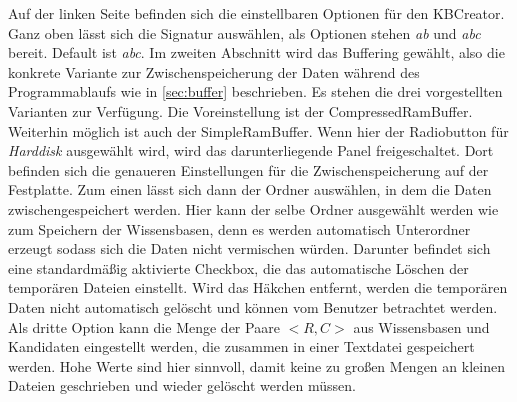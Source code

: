 \documentclass[12pt,a4paper]{article}
\begin{document}
Auf der linken Seite befinden sich die einstellbaren Optionen für den KBCreator. Ganz oben lässt sich die Signatur auswählen, als Optionen stehen \textit{ab} und \textit{abc} bereit. Default ist \textit{abc}. Im zweiten Abschnitt wird das Buffering gewählt, also die konkrete Variante zur Zwischenspeicherung der Daten während des Programmablaufs wie in \autoref{sec:buffer} beschrieben. Es stehen die drei vorgestellten Varianten zur Verfügung. Die Voreinstellung ist der CompressedRamBuffer. Weiterhin möglich ist auch der SimpleRamBuffer. Wenn hier der Radiobutton für \textit{Harddisk} ausgewählt wird, wird das darunterliegende Panel freigeschaltet. Dort befinden sich die genaueren Einstellungen für die Zwischenspeicherung auf der Festplatte. Zum einen lässt sich dann der Ordner auswählen, in dem die Daten zwischengespeichert werden. Hier kann der selbe Ordner ausgewählt werden wie zum Speichern der Wissensbasen, denn es werden automatisch Unterordner erzeugt sodass sich die Daten nicht vermischen würden. Darunter befindet sich eine standardmäßig aktivierte Checkbox, die das automatische Löschen der temporären Dateien einstellt. Wird das Häkchen entfernt, werden die temporären Daten nicht automatisch gelöscht und können vom Benutzer betrachtet werden. Als dritte Option kann die Menge der Paare $<R,C>$ aus Wissensbasen und Kandidaten eingestellt werden, die zusammen in einer Textdatei gespeichert werden. Hohe Werte sind hier sinnvoll, damit keine zu großen Mengen an kleinen Dateien geschrieben und wieder gelöscht werden müssen. \\
\end{document}
